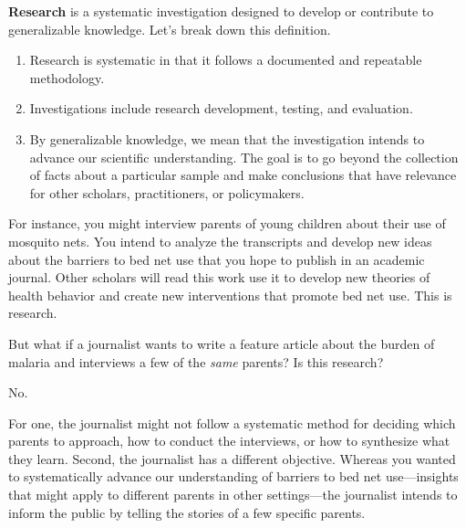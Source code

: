 \documentclass[
  letterpaper,
  DIV=11,
  numbers=noendperiod,
  oneside]{scrartcl}
\providecommand{\tightlist}{%
  \setlength{\itemsep}{0pt}\setlength{\parskip}{0pt}}\usepackage{longtable,booktabs,array}
\begin{document}
\textbf{Research} is a systematic investigation designed to develop or
contribute to generalizable knowledge. Let's break down this definition.

\begin{enumerate}
\def\labelenumi{\arabic{enumi}.}
\tightlist
\item
  Research is systematic in that it follows a documented and repeatable
  methodology.
\item
  Investigations include research development, testing, and evaluation.
\item
  By generalizable knowledge, we mean that the investigation intends to
  advance our scientific understanding. The goal is to go beyond the
  collection of facts about a particular sample and make conclusions
  that have relevance for other scholars, practitioners, or
  policymakers.
\end{enumerate}

For instance, you might interview parents of young children about their
use of mosquito nets. You intend to analyze the transcripts and develop
new ideas about the barriers to bed net use that you hope to publish in
an academic journal. Other scholars will read this work use it to
develop new theories of health behavior and create new interventions
that promote bed net use. This is research.

But what if a journalist wants to write a feature article about the
burden of malaria and interviews a few of the \emph{same} parents? Is
this research?


No.

For one, the journalist might not follow a systematic method for
deciding which parents to approach, how to conduct the interviews, or
how to synthesize what they learn. Second, the journalist has a
different objective. Whereas you wanted to systematically advance our
understanding of barriers to bed net use---insights that might apply to
different parents in other settings---the journalist intends to inform
the public by telling the stories of a few specific parents.
\end{document}
